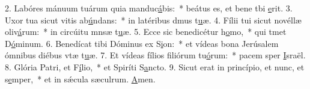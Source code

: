2. Labóres mánuum tuárum quia manduc\uline{á}bis:~* beátus es, et bene tbi \uline{e}rit.
3. Uxor tua sicut vitis ab\uline{ú}ndans:~* in latéribus dmus t\uline{u}æ.
4. Fílii tui sicut novéllæ oliv\uline{á}rum:~* in circúitu mnsæ t\uline{u}æ.
5. Ecce sic benedicétur h\uline{o}mo,~* qui tmet D\uline{ó}minum.
6. Benedícat tibi Dóminus ex S\uline{i}on:~* et vídeas bona Jerúsalem ómnibus diébus vtæ t\uline{u}æ.
7. Et vídeas fílios filiórum tu\uline{ó}rum:~* pacem sper \uline{I}sraël.
8. Glória Patri, et F\uline{í}lio,~* et Spiríti S\uline{a}ncto.
9. Sicut erat in princípio, et nunc, et s\uline{e}mper,~* et in sǽcula sæculrum. \uline{A}men.
